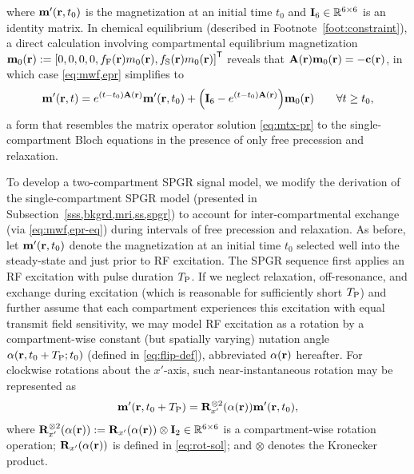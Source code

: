 where $\bmmp\prtz$ is the magnetization
at an initial time $t_0$
and $\mathbf{I}_{6} \in \mathbb{R}^{6 \times 6}$ 
is an identity matrix.
In chemical equilibrium
(described in Footnote~\ref{foot:constraint}),
a direct calculation involving 
compartmental equilibrium magnetization
$\bmmzero\pr := \brac{0,0,0,0,\ff\pr\mzero\pr,\fs\pr\mzero\pr}\tpose$
reveals that $\bmA\pr \bmmzero\pr = -\bmc\pr$,
in which case \eqref{eq:mwf,epr} simplifies to
\begin{align}
	\bmmp\prt = e^{\paren{t-t_0}\bmA\pr} \bmmp\prtz +
		\paren{\eye{6} - e^{\paren{t-t_0}\bmA\pr}} \bmmzero\pr
		\qquad \forall t \geq t_0,
		\label{eq:mwf,epr-eq}
\end{align}
a form that resembles 
the matrix operator solution \eqref{eq:mtx-pr}
to the single-compartment Bloch equations
in the presence
of only free precession and relaxation.

To develop a two-compartment SPGR signal model,
we modify the derivation 
of the single-compartment SPGR model
(presented in Subsection~\ref{sss,bkgrd,mri,ss,spgr})
to account for inter-compartmental exchange
(via \eqref{eq:mwf,epr-eq})
during intervals of free precession and relaxation.
As before,
let $\bmmp\prtz$ denote the magnetization
at an initial time $t_0$ selected 
well into the steady-state
and just prior to RF excitation.
The SPGR sequence first applies
an RF excitation
with pulse duration $T_\mathrm{P}$.
If we neglect relaxation,
off-resonance,
and exchange during excitation
(which is reasonable 
for sufficiently short $T_\mathrm{P}$) 
and further assume
that each compartment 
experiences this excitation
with equal transmit field sensitivity,
we may model RF excitation as a rotation
by a compartment-wise constant 
(but spatially varying)
nutation angle $\flip\prtzt{t_0+\TP}$
(defined in \eqref{eq:flip-def}),
abbreviated $\flip\pr$ hereafter.
For clockwise rotations
about the $x'$-axis,
such near-instantaneous rotation
may be represented as
\begin{align}
	\bmmp\paren{\bmr,t_0+\TP} = 
		\bmRxpsix{\flip\pr} \bmmp\prtz,
		\label{eq:mwf,spgr-ex}
\end{align}
where $\bmRxpsix{\flip\pr} := \bmRxp{\flip\pr} \otimes \eye{2} 
\in \reals{6 \times 6}$
is a compartment-wise rotation operation;
$\bmRxp{\flip\pr}$ is defined in \eqref{eq:rot-sol};
and $\otimes$ denotes the Kronecker product.

